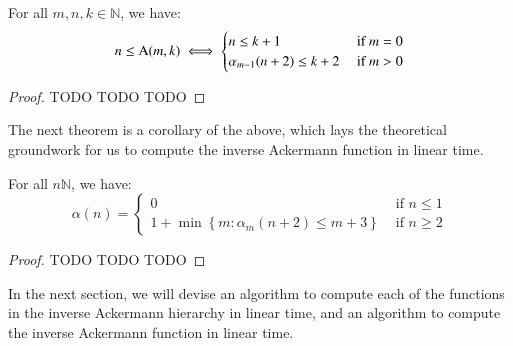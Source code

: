 \begin{thm}  \label{thm: inv_ack_ack}
For all $m, n, k \in \mathbb{N}$, we have:
\begin{equation}
n \le \text{A}(m, k) \iff \begin{cases}
n \le k + 1 & \text{ if } m = 0 \\ \alpha_{m-1}(n+2) \le k + 2 & \text{ if } m > 0
\end{cases}
\end{equation}
\end{thm}


\begin{proof}
TODO TODO TODO
\end{proof}

The next theorem is a corollary of the above, which lays the 
theoretical groundwork for us to compute the inverse Ackermann 
function in linear time.

\begin{thm}
For all $n\mathbb{N}$, we have:
\begin{equation}
\alpha(n) = \begin{cases}
0 & \text{ if } n \le 1 \\
1 + \min\left\{ m: \alpha_m(n+2) \le m + 3 \right\} & \text{ if } n \ge 2
\end{cases}
\end{equation}
\end{thm}

\begin{proof}
TODO TODO TODO
\end{proof}

In the next section, we will devise an algorithm to compute each 
of the functions in the inverse Ackermann hierarchy in linear time, 
and an algorithm to compute the inverse Ackermann function in linear time.
